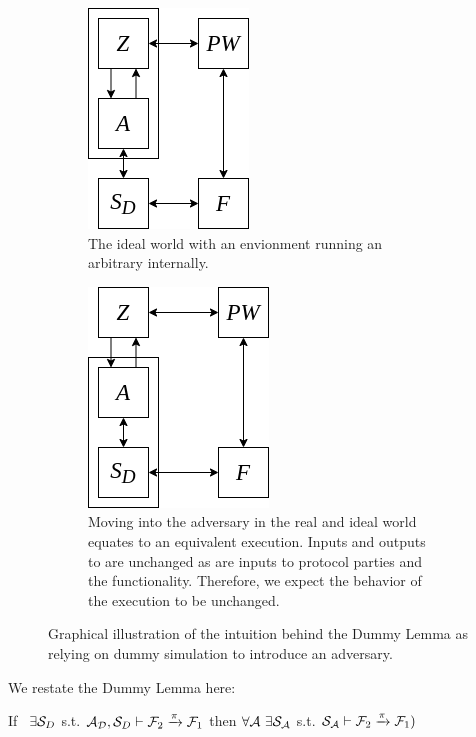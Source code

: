 \begin{figure}
	\begin{subfigure}[t]{0.45\textwidth}
	\centering
	\includegraphics[scale=0.5]{figures/dummylemma_pre.png}
	\caption{The ideal world with an envionment running an arbitrary \A internally.}
	\label{fig:dummy_pre}
	\end{subfigure}
	\hspace{2mm}
	\begin{subfigure}[t]{0.45\textwidth}
	\centering
	\includegraphics[scale=0.5]{figures/dummylemma_post.png}
	\caption{Moving \A into the adversary in the real and ideal world equates to an equivalent execution. Inputs and outputs to \DS are unchanged as are inputs to protocol parties and the functionality. Therefore, we expect the behavior of the execution to be unchanged.}
	\label{fig:dummy_post}
	\end{subfigure}
	\caption{Graphical illustration of the intuition behind the Dummy Lemma as relying on dummy simulation to introduce an adversary.}
	\label{fig:dummylemmas}
\end{figure}


We restate the Dummy Lemma here:
\begin{theorem}\label{thm:dummy}
If \ $\exists \mathcal{S}_{D}$ s.t. $ \mathcal{A}_\mathcal{D}, \mathcal{S}_{D} \vdash \mathcal{F}_2 \xrightarrow{\pi} \mathcal{F}_1$ then $\forall \mathcal{A} \ \exists \mathcal{S}_\mathcal{A}$ s.t. $\mathcal{S}_{\mathcal{A}} \vdash  \mathcal{F}_2 \xrightarrow{\pi} \mathcal{F}_1)$ 
\end{theorem}

